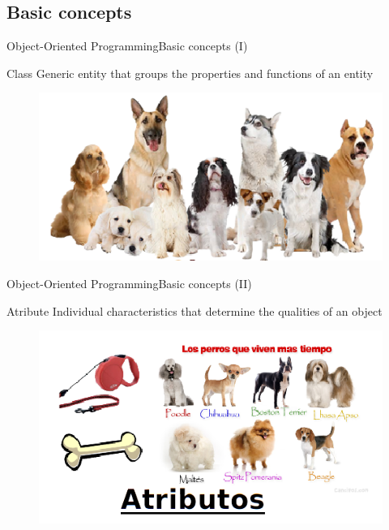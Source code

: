 \documentclass[10pt,compress]{beamer} %
\begin{document}
\subsection{Basic concepts}

\begin{frame}{Object-Oriented Programming}{Basic concepts (I)}
	\begin{block}{Class}
		 Generic entity that groups the \alert{properties} and \alert{functions} of an entity
  	\end{block}	
		\begin{figure}
			\includegraphics[scale=0.5]{figs/clase}	
		\end{figure}				
\end{frame}

\begin{frame}{Object-Oriented Programming}{Basic concepts (II)}
	\vfill\begin{block}{Atribute}
		Individual characteristics that determine the qualities of an object
  	\end{block}	
		\begin{figure}
			\includegraphics[scale=0.5]{figs/atributo}
		\end{figure}				
\end{frame}
\end{document}
